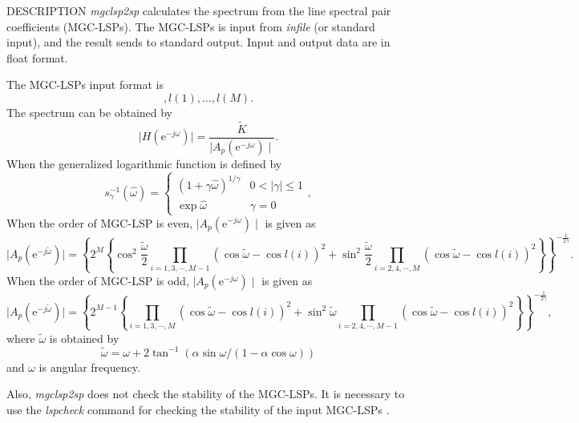 \begin{synopsis}
\item [mgclsp2sp] [ --a $A$ ] [ --g $G$ ] [ --c $C$ ] [ --m $M$ ] [ --s $S$] [ --l $L$ ] 
 [ --L ] [ --k ] \newline [ --q $Q$ ] [ --o $O$ ] [ {\em infile} ]
\end{synopsis}

\begin{qsection}{DESCRIPTION}
{\em mgclsp2sp} calculates the spectrum from the line spectral pair coefficients (MGC-LSPs).
The MGC-LSPs is input from {\em infile} (or standard input), and the result sends to standard output.
Input and output data are in float format.

The MGC-LSPs input format is
\begin{displaymath}
 [ \tilde{K} ], l(1), \dots, l(M).
\end{displaymath}
The spectrum can be obtained by
\begin{displaymath}
 \mid H(\mathrm{e}^{-j\omega}) \mid = \frac{\tilde{K}}{\mid A_p(\mathrm{e}^{-j\omega}) \mid}.
\end{displaymath}
When the generalized logarithmic function is defined by
\begin{displaymath}
 s_{\gamma}^{-1}(\hat{\omega}) = \left\{
                    \begin{array}{ll}
                     (1 + \gamma \hat{\omega})^{1/\gamma } & 0<|\gamma|\le 1 \\
                     \exp \hat{\omega} & \gamma = 0
                    \end{array}
                   \right. ,
\end{displaymath}
When the order of MGC-LSP is even, $\mid A_p(\mathrm{e}^{-j\omega}) \mid$ is given as
\begin{displaymath}
 \mid A_p(\mathrm{e}^{-j\tilde{\omega}}) \mid =  \left\{ 2^M \left\{ \cos^2 \frac{\tilde{\omega}}{2}\prod_{i=1,3,\cdots,M-1}(\cos \tilde{\omega} - \cos l(i))^2 + \sin^2 \frac{\tilde{\omega}}{2}\prod_{i=2,4,\cdots,M}(\cos \tilde{\omega} - \cos l(i))^2 \right\} \right\}^{-\frac{1}{2\gamma }}.
\end{displaymath}
When the order of MGC-LSP is odd, $\mid A_p(\mathrm{e}^{-j\omega}) \mid$ is given as
\begin{displaymath}
\mid A_p(\mathrm{e}^{-j\tilde{\omega}}) \mid = \left\{ 2^{M-1} \left\{ \prod_{i=1,3,\cdots,M}(\cos \tilde{\omega} - \cos l(i))^2 + \sin^2 \tilde{\omega} \prod_{i=2,4,\cdots,M-1}(\cos \tilde{\omega} - \cos l(i))^2 \right\} \right\}^{-\frac{1}{2\gamma }} ,
\end{displaymath}
where $\tilde{\omega}$ is obtained by
\begin{displaymath}
 \tilde{\omega} = \omega + 2\tan^{-1}(\alpha \sin \omega / (1 - \alpha \cos \omega))
\end{displaymath}
and $\omega$ is angular frequency.

Also, {\em mgclsp2sp} does not check the stability of the MGC-LSPs.
It is necessary to use the {\em lspcheck} command
for checking the stability of the input MGC-LSPs . 
\end{qsection}

